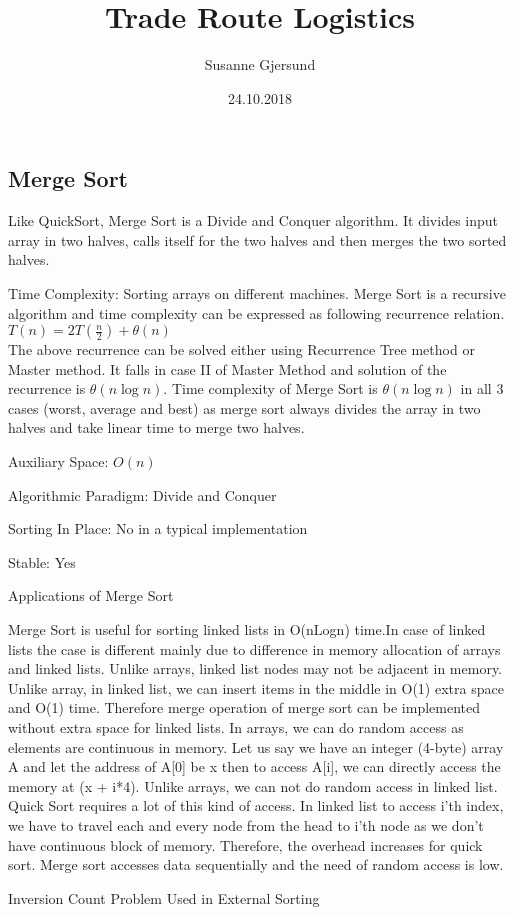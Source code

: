 \documentclass{article}
\title{Trade Route Logistics}
\author{Susanne Gjersund\\
}
\date{24.10.2018}
\begin{document}
\subsection{Merge Sort}


Like QuickSort, Merge Sort is a Divide and Conquer algorithm. It divides input array in two halves, calls itself for the two halves and then merges the two sorted halves.

Time Complexity: Sorting arrays on different machines. Merge Sort is a recursive algorithm and time complexity can be expressed as following recurrence relation. \\
$T(n) = 2T(\frac{n}{2}) + \theta(n)$ \\
The above recurrence can be solved either using Recurrence Tree method or Master method. It falls in case II of Master Method and solution of the recurrence is $\theta(n\log n)$.
Time complexity of Merge Sort is $\theta(n\log n)$ in all 3 cases (worst, average and best) as merge sort always divides the array in two halves and take linear time to merge two halves.

Auxiliary Space: $O(n)$

Algorithmic Paradigm: Divide and Conquer

Sorting In Place: No in a typical implementation

Stable: Yes

Applications of Merge Sort

Merge Sort is useful for sorting linked lists in O(nLogn) time.In case of linked lists the case is different mainly due to difference in memory allocation of arrays and linked lists. Unlike arrays, linked list nodes may not be adjacent in memory. Unlike array, in linked list, we can insert items in the middle in O(1) extra space and O(1) time. Therefore merge operation of merge sort can be implemented without extra space for linked lists.
In arrays, we can do random access as elements are continuous in memory. Let us say we have an integer (4-byte) array A and let the address of A[0] be x then to access A[i], we can directly access the memory at (x + i*4). Unlike arrays, we can not do random access in linked list. Quick Sort requires a lot of this kind of access. In linked list to access i’th index, we have to travel each and every node from the head to i’th node as we don’t have continuous block of memory. Therefore, the overhead increases for quick sort. Merge sort accesses data sequentially and the need of random access is low.

Inversion Count Problem
Used in External Sorting
\end{document}
